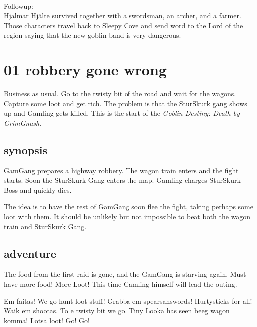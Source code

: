 \

Followup: \\
Hjalmar Hjälte survived together with a swordsman, an archer, and a farmer. Those characters travel back to Sleepy Cove and send word to the Lord of the region saying that the new goblin band is very dangerous.




\newpage
\section*{01 robbery gone wrong}

Business as usual. Go to the twisty bit of the road and wait for the wagons. Capture some loot and get rich. The problem is that the SturSkurk gang shows up and Gamling gets killed. This is the start of the \emph{Goblin Destiny: Death by GrimGnash}.


\subsection*{synopsis}

GamGang prepares a highway robbery. The wagon train enters and the fight starts. Soon the SturSkurk Gang enters the map. Gamling charges SturSkurk Boss and quickly dies.

The idea is to have the rest of GamGang soon flee the fight, taking perhaps some loot with them. It should be unlikely but not impossible to beat both the wagon train and SturSkurk Gang.


\subsection*{adventure}

The food from the first raid is gone, and the GamGang is starving again. Must have more food! More Loot! This time Gamling himself will lead the outing.

\begin{readoutloud}
Em faitas! We go hunt loot stuff! Grabba em spearsanswords! Hurtysticks for all! Waik em shootas. To e twisty bit we go. Tiny Looka has seen beeg wagon komma! Lotsa loot! Go! Go!
\end{readoutloud}

